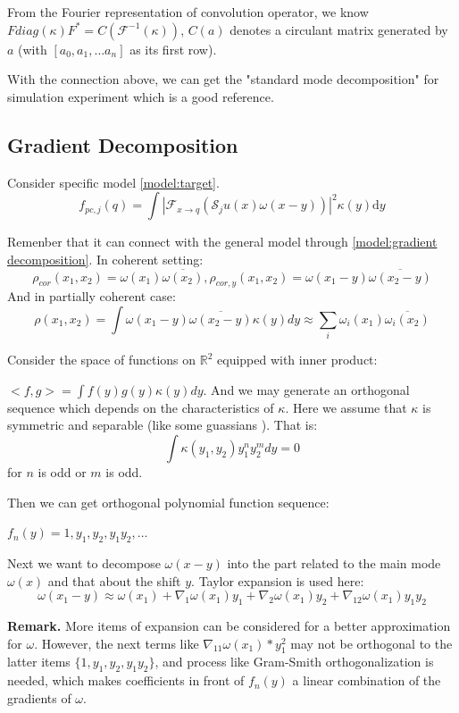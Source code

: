 \documentclass{article}
\numberwithin{equation}{section}
\begin{document}
From the Fourier representation of convolution operator, we know 
$F diag(\kappa) F^* = C(\mathcal{F}^{-1} (\kappa))$, $C(a)$ denotes a circulant matrix generated by $a$ (with $[a_0,a_1, \dots a_n ]$ as its first row). 


With the connection above, we can get the "standard mode decomposition" for simulation experiment which is a good reference.

\subsection{Gradient Decomposition}



Consider specific model \ref{model:target}.
\begin{equation}
f_{p c, j}(q) = \int\left|\mathcal{F}_{x \rightarrow q}\left(\mathcal{S}_{j} u(x) \omega(x-y)\right)\right|^{2} \kappa(y) \mathrm{d} y
\end{equation}

 Remenber that it can connect with the general model through \eqref{model:gradient decomposition}. 
In coherent setting:
$$
\rho_{cor}(x_1,x_2) = \omega(x_1) \overline{\omega(x_2)},
\rho_{cor,y}(x_1,x_2) = \omega(x_1 - y) \overline{\omega(x_2-y)}
$$
And in partially coherent case:
\begin{equation}
 \rho(x_1,x_2) = \int \omega(x_1-y) \overline{\omega(x_2-y)} \kappa(y) dy \approx\sum_i \omega_i(x_1) \overline{\omega_i(x_2)}
\end{equation}

Consider the space of functions on  $\mathbb{R}^2$ equipped with inner product:

$<f,g> = \int f(y)g(y)\kappa(y) dy$.
And we may generate an orthogonal sequence which depends on the characteristics of $\kappa$. Here we assume that $\kappa$ is symmetric and separable (like some guassians ). That is:
$$
 \int \kappa(y_1,y_2) y_1^n y_2 ^m dy =0 
$$ for $n$ is odd or $m$ is odd.
 
Then we can get orthogonal polynomial function sequence:

$f_n(y) = 1,y_1,y_2,y_1y_2, ...$

Next we want to decompose $\omega(x-y)$ into the part related to the main mode $\omega(x)$ and that about the shift $y$. Taylor expansion is used here:
$$
\omega(x_1-y) \approx \omega(x_1) + \nabla_1 \omega(x_1)y_1 + \nabla_2 \omega(x_1)y_2 + \nabla_{12}\omega(x_1) y_1 y_2  
$$

\textbf{Remark.} More items of expansion can be considered for a better approximation for $\omega$. However, the next terms like $\nabla_{11} \omega(x_1) * y_1^2 $ may not be orthogonal to the latter items $\{1,y_1,y_2,y_1y_2\}$, and process like Gram-Smith orthogonalization is needed, which makes  coefficients in front of $f_n(y)$ a linear combination of the gradients of $\omega$.
\end{document}
